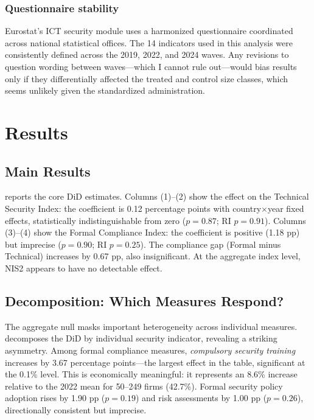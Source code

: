\documentclass[12pt]{article}
\begin{document}
\subsubsection*{Questionnaire stability} Eurostat's ICT security module uses a harmonized questionnaire coordinated across national statistical offices. The 14 indicators used in this analysis were consistently defined across the 2019, 2022, and 2024 waves. Any revisions to question wording between waves---which I cannot rule out---would bias results only if they differentially affected the treated and control size classes, which seems unlikely given the standardized administration.


\section{Results}

\subsection{Main Results}



 reports the core DiD estimates. Columns (1)--(2) show the effect on the Technical Security Index: the coefficient is 0.12 percentage points with country$\times$year fixed effects, statistically indistinguishable from zero ($p = 0.87$; RI $p = 0.91$). Columns (3)--(4) show the Formal Compliance Index: the coefficient is positive (1.18 pp) but imprecise ($p = 0.90$; RI $p = 0.25$). The compliance gap (Formal minus Technical) increases by 0.67 pp, also insignificant. At the aggregate index level, NIS2 appears to have no detectable effect.

\subsection{Decomposition: Which Measures Respond?}



The aggregate null masks important heterogeneity across individual measures.  decomposes the DiD by individual security indicator, revealing a striking asymmetry. Among formal compliance measures, \textit{compulsory security training} increases by 3.67 percentage points---the largest effect in the table, significant at the 0.1\% level. This is economically meaningful: it represents an 8.6\% increase relative to the 2022 mean for 50--249 firms (42.7\%). Formal security policy adoption rises by 1.90 pp ($p = 0.19$) and risk assessments by 1.00 pp ($p = 0.26$), directionally consistent but imprecise.
\end{document}
